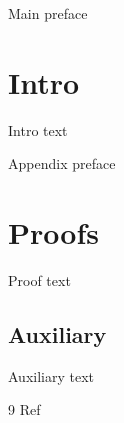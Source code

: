 \documentclass{article}
\begin{document}
\begin{abstract}
Abstract text
\end{abstract}

\maketitle

Main preface
\label{main:preface}

\section{Intro}
\label{sec:intro}
Intro text

\appendix

Appendix preface
\label{app:preface}

\section{Proofs}
\label{app:sec:proofs}
Proof text

\subsection{Auxiliary}
\label{app:sub:aux}
Auxiliary text

\begin{thebibliography}{9}
 Ref
\end{thebibliography}
\end{document}
